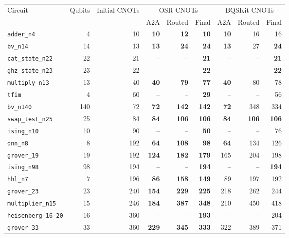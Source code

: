 \begin{table}[p]
\centering
\scriptsize
\begin{tabular}{lrr|rrr|rrr}
\hline
Circuit & Qubits & Initial CNOTs & \multicolumn{3}{c|}{OSR CNOTs} & \multicolumn{3}{c}{BQSKit CNOTs} \\
 & & & A2A & Routed & Final & A2A & Routed & Final \\
\hline
\texttt{adder\_n4} & 4 & 10 & \textbf{10} & \textbf{12} & \textbf{10} & \textbf{10} & 16 & 16 \\
\texttt{bv\_n14} & 14 & 13 & \textbf{13} & \textbf{24} & \textbf{24} & \textbf{13} & 27 & \textbf{24} \\
\texttt{cat\_state\_n22} & 22 & 21 & -- & -- & \textbf{21} & -- & -- & \textbf{21} \\
\texttt{ghz\_state\_n23} & 23 & 22 & -- & -- & \textbf{22} & -- & -- & \textbf{22} \\
\texttt{multiply\_n13} & 13 & 40 & \textbf{40} & \textbf{79} & \textbf{77} & \textbf{40} & 80 & 78 \\
\texttt{tfim} & 4 & 60 & -- & -- & \textbf{29} & -- & -- & 56 \\
\texttt{bv\_n140} & 140 & 72 & \textbf{72} & \textbf{142} & \textbf{142} & \textbf{72} & 348 & 334 \\
\texttt{swap\_test\_n25} & 25 & 84 & \textbf{84} & \textbf{106} & \textbf{106} & \textbf{84} & \textbf{106} & \textbf{106} \\
\texttt{ising\_n10} & 10 & 90 & -- & -- & \textbf{50} & -- & -- & 76 \\
\texttt{dnn\_n8} & 8 & 192 & \textbf{64} & \textbf{108} & \textbf{98} & \textbf{64} & 134 & 126 \\
\texttt{grover\_19} & 19 & 192 & \textbf{124} & \textbf{182} & \textbf{179} & 165 & 204 & 198 \\
\texttt{ising\_n98} & 98 & 194 & -- & -- & \textbf{194} & -- & -- & \textbf{194} \\
\texttt{hhl\_n7} & 7 & 196 & \textbf{86} & \textbf{158} & \textbf{149} & 89 & 197 & 192 \\
\texttt{grover\_23} & 23 & 240 & \textbf{154} & \textbf{229} & \textbf{225} & 218 & 262 & 244 \\
\texttt{multiplier\_n15} & 15 & 246 & \textbf{184} & \textbf{387} & \textbf{348} & 210 & 450 & 418 \\
\texttt{heisenberg-16-20} & 16 & 360 & -- & -- & \textbf{193} & -- & -- & 204 \\
\texttt{grover\_33} & 33 & 360 & \textbf{229} & \textbf{345} & \textbf{333} & 322 & 389 & 371 \\

\end{tabular}
\end{table}
